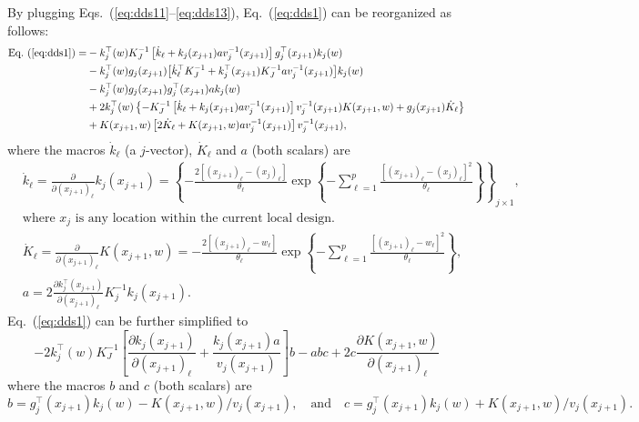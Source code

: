 \documentclass[12pt]{article}
\begin{document}
By plugging Eqs.~(\ref{eq:dds11}--\ref{eq:dds13}), Eq.~(\ref{eq:dds1}) can be reorganized as follows:
\begin{equation}
\begin{aligned}
\mbox{Eq.~(\ref{eq:dds1})} = &-k^\top_j(w)K_J^{-1}\left[\dot{k}_\ell + k_j(x_{j+1})av_j^{-1}(x_{j+1})\right]g_j^\top(x_{j+1})k_j(w)\nonumber\\
& - k^\top_j(w)g_j(x_{j+1})\!\left[\dot{k}^\top_\ell K_J^{-1} + k_j^\top (x_{j+1})K_J^{-1}av_j^{-1}(x_{j+1})\right]\!k_j(w)\nonumber\\
&-k_j^\top (w) g_j(x_{j+1})g_j^\top(x_{j+1})ak_j(w) \nonumber \\
&+2k_j^\top(w) \left\{-K_J^{-1}\left[\dot{k}_\ell+ k_j(x_{j+1})av_j^{-1}(x_{j+1})\right]v_j^{-1}(x_{j+1})K(x_{j+1},w)+ g_j(x_{j+1})\dot{K}_\ell\right\}\nonumber \\
&+ K(x_{j+1},w)\left[2\dot{K}_\ell + K(x_{j+1},w)av_j^{-1}(x_{j+1})\right]v_j^{-1}(x_{j+1}),\nonumber \\
\end{aligned}
\end{equation}
where the macros $\dot{k}_\ell$ (a $j$-vector), $\dot{K}_\ell$ and $a$ (both scalars) are
\begin{align*}
&\dot{k}_\ell =\frac{\partial}{\partial (x_{j+1})_\ell} k_j (x_{j+1})= \left\{- \frac{2\left[(x_{j+1})_\ell - (x_j)_\ell\right]}{ \theta_\ell} \exp\left\{-\sum_{\ell=1}^p \frac{\left[(x_{j+1})_\ell-(x_j)_\ell\right]^2}{\theta_\ell}\right\}\right\}_{j\times 1}, \nonumber \\
&\text{where $x_j$ is any location within the current local design}.\\
&\dot{K}_\ell =\frac{\partial}{\partial (x_{j+1})_\ell} K(x_{j+1}, w)= -\frac{2\left[(x_{j+1})_\ell - w_\ell \right]}{\theta_\ell} \exp\left\{-\sum_{\ell=1}^p \frac{\left[(x_{j+1})_\ell-w_\ell\right]^2}{\theta_\ell} \right\},\\
&a = 2 \frac{\partial k_j^\top (x_{j+1})}{\partial (x_{j+1})_\ell} K_j^{-1} k_j (x_{j+1}). 
\end{align*}
Eq.~(\ref{eq:dds1}) can be further simplified to\\ 
\begin{equation}
-2k^\top_j(w)K^{-1}_J\left[ \frac{\partial k_j (x_{j+1}) }{\partial (x_{j+1})_\ell}  + \frac{ k_j (x_{j+1}) a}{v_j(x_{j+1})} \right]b-abc + 
2 c \frac{\partial K(x_{j+1}, w)}{\partial (x_{j+1})_\ell}  \nonumber
\end{equation}
where the macros $b$ and $c$ (both scalars) are
\begin{equation}
b =g_j^\top (x_{j+1})k_j(w) - K(x_{j+1},w)/v_j(x_{j+1}), \quad \mbox{and} \quad c =g_j^\top (x_{j+1})k_j(w) + K(x_{j+1},w)/v_j(x_{j+1}) \nonumber.  
\end{equation}
\end{document}
